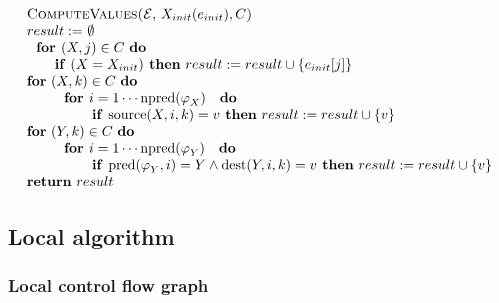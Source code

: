 \begin{equation*}
\begin{tabular}{l}
\textsc{ComputeValues(}$\mathcal{E}$, $X_{init}(e_{init}),C$\textsc{)} \\ 
$result:=$ $\emptyset $ \\ 
$\text{\textbf{for }}(X,j)\in C$ \textbf{do} \\ 
$\qquad $\textbf{if} $(X=X_{init})$\textbf{\ then} $result:=result\cup
\{e_{init}[j]\}$ \\ 
\textbf{for} $(X,k)\in C$ \textbf{do} \\ 
$\qquad \text{\textbf{for }}i=1\cdots \mathrm{npred}(\varphi _{X})\text{ 
\textbf{do}}$ \\ 
$\qquad \qquad \text{\textbf{if }}\mathrm{source}(X,i,k)=v$\textbf{\ then} $%
result:=result\cup \{v\}$ \\ 
\textbf{for} $(Y,k)\in C$ \textbf{do} \\ 
$\qquad \text{\textbf{for }}i=1\cdots \mathrm{npred}(\varphi _{Y})\text{ 
\textbf{do}}$ \\ 
$\qquad \qquad \text{\textbf{if }}\mathrm{pred}(\varphi _{Y},i)=Y\wedge 
\mathrm{dest}(Y,i,k)=v$\textbf{\ then} $result:=result\cup \{v\}$ \\ 
\textbf{return} $result$%
\end{tabular}%
\end{equation*}

\newpage

\subsection{Local algorithm}

\subsubsection{Local control flow graph}

